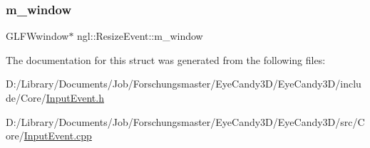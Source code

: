\subsubsection{\texorpdfstring{m\+\_\+window}{m\_window}}
{\footnotesize\ttfamily G\+L\+F\+Wwindow$\ast$ ngl\+::\+Resize\+Event\+::m\+\_\+window}



The documentation for this struct was generated from the following files\+:\begin{DoxyCompactItemize}
\item 
D\+:/\+Library/\+Documents/\+Job/\+Forschungsmaster/\+Eye\+Candy3\+D/\+Eye\+Candy3\+D/include/\+Core/\mbox{\hyperlink{_input_event_8h}{Input\+Event.\+h}}\item 
D\+:/\+Library/\+Documents/\+Job/\+Forschungsmaster/\+Eye\+Candy3\+D/\+Eye\+Candy3\+D/src/\+Core/\mbox{\hyperlink{_input_event_8cpp}{Input\+Event.\+cpp}}\end{DoxyCompactItemize}
